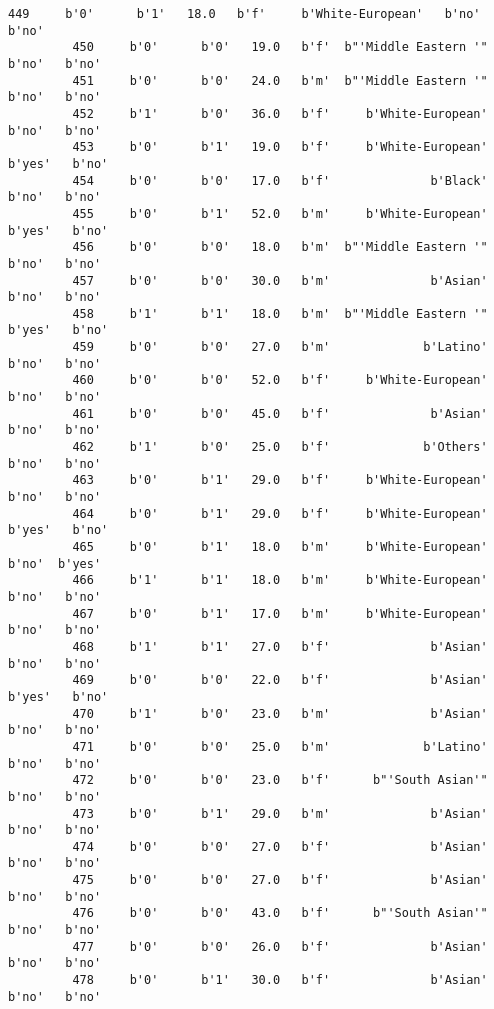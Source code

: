 \documentclass[11pt]{article}
\begin{document}
\begin{Verbatim}[commandchars=\\\{\}]
         449     b'0'      b'1'   18.0   b'f'     b'White-European'   b'no'   b'no'   
         450     b'0'      b'0'   19.0   b'f'  b"'Middle Eastern '"   b'no'   b'no'   
         451     b'0'      b'0'   24.0   b'm'  b"'Middle Eastern '"   b'no'   b'no'   
         452     b'1'      b'0'   36.0   b'f'     b'White-European'   b'no'   b'no'   
         453     b'0'      b'1'   19.0   b'f'     b'White-European'  b'yes'   b'no'   
         454     b'0'      b'0'   17.0   b'f'              b'Black'   b'no'   b'no'   
         455     b'0'      b'1'   52.0   b'm'     b'White-European'  b'yes'   b'no'   
         456     b'0'      b'0'   18.0   b'm'  b"'Middle Eastern '"   b'no'   b'no'   
         457     b'0'      b'0'   30.0   b'm'              b'Asian'   b'no'   b'no'   
         458     b'1'      b'1'   18.0   b'm'  b"'Middle Eastern '"  b'yes'   b'no'   
         459     b'0'      b'0'   27.0   b'm'             b'Latino'   b'no'   b'no'   
         460     b'0'      b'0'   52.0   b'f'     b'White-European'   b'no'   b'no'   
         461     b'0'      b'0'   45.0   b'f'              b'Asian'   b'no'   b'no'   
         462     b'1'      b'0'   25.0   b'f'             b'Others'   b'no'   b'no'   
         463     b'0'      b'1'   29.0   b'f'     b'White-European'   b'no'   b'no'   
         464     b'0'      b'1'   29.0   b'f'     b'White-European'  b'yes'   b'no'   
         465     b'0'      b'1'   18.0   b'm'     b'White-European'   b'no'  b'yes'   
         466     b'1'      b'1'   18.0   b'm'     b'White-European'   b'no'   b'no'   
         467     b'0'      b'1'   17.0   b'm'     b'White-European'   b'no'   b'no'   
         468     b'1'      b'1'   27.0   b'f'              b'Asian'   b'no'   b'no'   
         469     b'0'      b'0'   22.0   b'f'              b'Asian'  b'yes'   b'no'   
         470     b'1'      b'0'   23.0   b'm'              b'Asian'   b'no'   b'no'   
         471     b'0'      b'0'   25.0   b'm'             b'Latino'   b'no'   b'no'   
         472     b'0'      b'0'   23.0   b'f'      b"'South Asian'"   b'no'   b'no'   
         473     b'0'      b'1'   29.0   b'm'              b'Asian'   b'no'   b'no'   
         474     b'0'      b'0'   27.0   b'f'              b'Asian'   b'no'   b'no'   
         475     b'0'      b'0'   27.0   b'f'              b'Asian'   b'no'   b'no'   
         476     b'0'      b'0'   43.0   b'f'      b"'South Asian'"   b'no'   b'no'   
         477     b'0'      b'0'   26.0   b'f'              b'Asian'   b'no'   b'no'   
         478     b'0'      b'1'   30.0   b'f'              b'Asian'   b'no'   b'no'   

\end{Verbatim}
\end{document}
